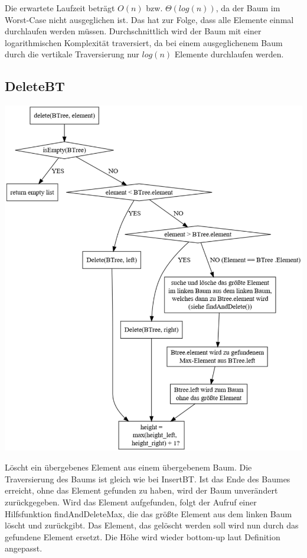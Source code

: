 \documentclass[11pt]{article}
\begin{document}
    Die erwartete Laufzeit beträgt
    \begin{math}
        O(n)
    \end {math}
    bzw.
    \begin{math}
        \Theta (log (n))
    \end{math},
    da der Baum im Worst-Case nicht ausgeglichen ist.
    Das hat zur Folge, dass alle Elemente einmal durchlaufen werden müssen.
    Durchschnittlich wird der Baum mit einer logarithmischen Komplexität
    traversiert, da bei einem ausgeglichenem Baum durch die vertikale
    Traversierung nur
    \begin{math}
        log (n)
    \end{math}
    Elemente durchlaufen werden.

    \subsection{DeleteBT}\label{subsec:deletebt}

    \begin{center}
        \includegraphics[width=0.8\columnwidth] {delete.pdf}
    \end{center}

    Löscht ein übergebenes Element aus einem übergebenem Baum.
    Die Traversierung des Baums ist gleich wie bei InsertBT.
    Ist das Ende des Baumes erreicht, ohne das Element gefunden zu haben,
    wird der Baum unverändert zurückgegeben.
    Wird das Element aufgefunden, folgt der Aufruf einer Hilfsfunktion findAndDeleteMax, die das größte Element aus dem linken Baum löscht und zurückgibt. Das Element, das gelöscht werden soll wird nun durch das gefundene Element ersetzt. Die Höhe wird wieder bottom-up laut Definition angepasst.
\end{document}
